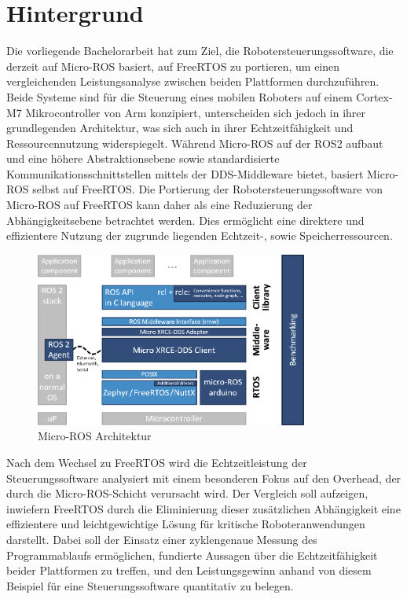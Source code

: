 \section{Hintergrund}

Die vorliegende Bachelorarbeit hat zum Ziel, die Robotersteuerungssoftware, die
derzeit auf Micro-ROS basiert, auf FreeRTOS zu portieren, um einen
vergleichenden Leistungsanalyse zwischen beiden Plattformen durchzuführen. Beide
Systeme sind für die Steuerung eines mobilen Roboters auf einem Cortex-M7
Mikrocontroller von Arm konzipiert, unterscheiden sich jedoch in ihrer
grundlegenden Architektur, was sich auch in ihrer Echtzeitfähigkeit und
Ressourcennutzung widerspiegelt. Während Micro-ROS auf der \ac{ROS}2 aufbaut und
eine höhere Abstraktionsebene sowie standardisierte Kommunikationsschnittstellen
mittels der \ac{DDS}-Middleware bietet, basiert Micro-ROS selbst auf FreeRTOS.
Die Portierung der Robotersteuerungssoftware von Micro-ROS auf FreeRTOS kann
daher als eine Reduzierung der Abhängigkeitsebene betrachtet werden. Dies
ermöglicht eine direktere und effizientere Nutzung der zugrunde liegenden
Echtzeit-, sowie Speicherressourcen.

\begin{figure}[htb]
    \centering
    \includegraphics[width=0.8\textwidth]{assets/Micro-ROS_architecture}
    \caption{Micro-ROS Architektur\cite[S. 6]{koubaa2023}}
\end{figure}

Nach dem Wechsel zu FreeRTOS wird die Echtzeitleistung der Steuerungssoftware
analysiert mit einem besonderen Fokus auf den Overhead, der durch die
Micro-ROS-Schicht verursacht wird. Der Vergleich soll aufzeigen, inwiefern
FreeRTOS durch die Eliminierung dieser zusätzlichen Abhängigkeit eine
effizientere und leichtgewichtige Lösung für kritische Roboteranwendungen
darstellt. Dabei soll der Einsatz einer zyklengenaue Messung des Programmablaufs
ermöglichen, fundierte Aussagen über die Echtzeitfähigkeit beider Plattformen zu
treffen, und den Leistungsgewinn anhand von diesem Beispiel für eine
Steuerungssoftware quantitativ zu belegen.


